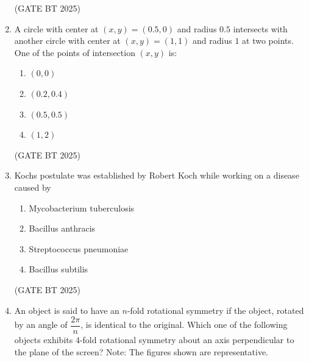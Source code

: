 \documentclass[journal,12pt,onecolumn]{IEEEtran}
\theoremstyle{remark}
\begin{document}
\begin{enumerate}
\hfill (GATE BT 2025)

\item A circle with center at $(x, y) = (0.5, 0)$ and radius $0.5$ intersects with another circle with center at $(x, y) = (1, 1)$ and radius $1$ at two points. One of the points of intersection $(x, y)$ is:  
\begin{multicols}{2}

\begin{enumerate}
    \item $(0, 0)$
    \item $(0.2, 0.4)$
    \item $(0.5, 0.5)$
    \item $(1, 2)$
\end{enumerate} 
\end{multicols}
\hfill (GATE BT 2025)

\item Kochs postulate was established by Robert Koch while working on a disease caused by  
\begin{multicols}{2}
\begin{enumerate}
    \item Mycobacterium tuberculosis
    \item Bacillus anthracis
    \item Streptococcus pneumoniae
    \item Bacillus subtilis
\end{enumerate}  
\end{multicols}
\hfill (GATE BT 2025)

\item An object is said to have an $n$-fold rotational symmetry if the object, rotated by an angle of $\dfrac{2\pi}{n}$, is identical to the original. Which one of the following objects exhibits 4-fold rotational symmetry about an axis perpendicular to the plane of the screen? {Note: The figures shown are representative.}


\end{enumerate}
\end{document}
